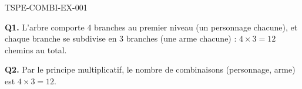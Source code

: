 \begin{corrige}{TSPE-COMBI-EX-001}

\textbf{Q1.} L'arbre comporte $4$ branches au premier niveau (un personnage chacune), et chaque branche se subdivise en $3$ branches (une arme chacune) : $4 \times 3 = 12$ chemins au total.

\textbf{Q2.} Par le principe multiplicatif, le nombre de combinaisons (personnage, arme) est $4 \times 3 = \boxed{12}$.

\end{corrige}
